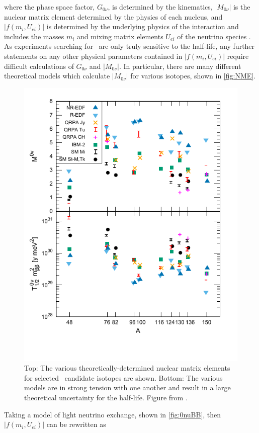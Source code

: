 where the phase space factor, $G_{0\nu}$, is determined by the kinematics, $|M_{0\nu}|$ is the nuclear matrix element determined by the physics of each nucleus, and $|f(m_i, U_{ei})|$ is determined by the underlying physics of the interaction and includes the masses $m_i$ and mixing matrix elements $U_{ei}$ of the neutrino species \cite{Barea:2013bz}.
As experiments searching for \zeronubb~are only truly sensitive to the half-life, any further statements on any other physical parameters contained in $|f(m_i, U_{ei})|$ require difficult calculations of $G_{0\nu}$ and $|M_{0\nu}|$.
In particular, there are many different theoretical models which calculate $|M_{0\nu}|$ for various isotopes, shown in \autoref{fig:NME}.
\begin{figure}[htbp]
    \centering
    \includegraphics[width=0.8\linewidth]{Figures/NMEversusA.pdf}
    \caption[The various theoretically-determined nuclear matrix elements for selected \zeronubb~candidate isotopes]
    {Top: The various theoretically-determined nuclear matrix elements for selected \zeronubb~candidate isotopes are shown.
    Bottom: The various models are in strong tension with one another and result in a large theoretical uncertainty for the half-life. Figure from \cite{Engel:NME}.}
    \label{fig:NME}
\end{figure}
Taking a model of light neutrino exchange, shown in \autoref{fig:0nuBB}, then $|f(m_i, U_{ei})|$ can be rewritten as
